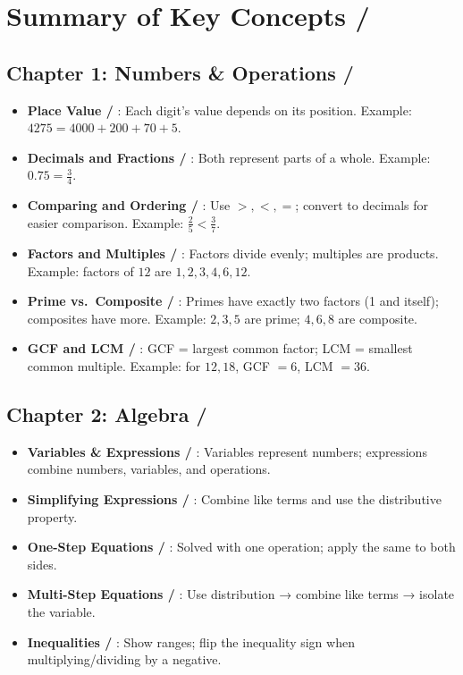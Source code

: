 \cleardoublepage
\section*{Summary of Key Concepts / }

\subsection*{Chapter 1: Numbers \& Operations / }
\begin{itemize}
  \item \textbf{Place Value / }: Each digit's value depends on its position.  
  Example: $4275 = 4000 + 200 + 70 + 5$.
  \item \textbf{Decimals and Fractions / }: Both represent parts of a whole.  
  Example: $0.75 = \tfrac{3}{4}$.
  \item \textbf{Comparing and Ordering / }: Use $>,<,=$; convert to decimals for easier comparison.  
  Example: $\tfrac{2}{5} < \tfrac{3}{7}$.
  \item \textbf{Factors and Multiples / }: Factors divide evenly; multiples are products.  
  Example: factors of $12$ are $1,2,3,4,6,12$.
  \item \textbf{Prime vs.\ Composite / }: Primes have exactly two factors (1 and itself); composites have more.  
  Example: $2,3,5$ are prime; $4,6,8$ are composite.
  \item \textbf{GCF and LCM / }:  
  GCF = largest common factor; LCM = smallest common multiple.  
  Example: for $12,18$, GCF $=6$, LCM $=36$.
\end{itemize}

\subsection*{Chapter 2: Algebra / }
\begin{itemize}
  \item \textbf{Variables \& Expressions / }: Variables represent numbers; expressions combine numbers, variables, and operations.  
  \item \textbf{Simplifying Expressions / }: Combine like terms and use the distributive property.  
  \item \textbf{One-Step Equations / }: Solved with one operation; apply the same to both sides.  
  \item \textbf{Multi-Step Equations / }: Use distribution → combine like terms → isolate the variable.  
  \item \textbf{Inequalities / }: Show ranges; flip the inequality sign when multiplying/dividing by a negative.  
\end{itemize}

